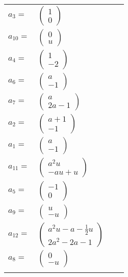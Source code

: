 \documentclass[1p]{elsarticle_modified}
\theoremstyle{definition}
\begin{document}
\begin{tabular}{m{7pt} m{180pt} m{7pt} m{180pt} }
\flushright $a_{3}=$&$\begin{pmatrix}1\\0\end{pmatrix}$ \\
\flushright $a_{10}=$&$\begin{pmatrix}0\\u\end{pmatrix}$ \\
\flushright $a_{4}=$&$\begin{pmatrix}1\\-2\end{pmatrix}$ \\
\flushright $a_{6}=$&$\begin{pmatrix}a\\-1\end{pmatrix}$ \\
\flushright $a_{7}=$&$\begin{pmatrix}a\\2 a-1\end{pmatrix}$ \\
\flushright $a_{2}=$&$\begin{pmatrix}a+1\\-1\end{pmatrix}$ \\
\flushright $a_{1}=$&$\begin{pmatrix}a\\-1\end{pmatrix}$ \\
\flushright $a_{11}=$&$\begin{pmatrix}a^2 u\\- a u+u\end{pmatrix}$ \\
\flushright $a_{5}=$&$\begin{pmatrix}-1\\0\end{pmatrix}$ \\
\flushright $a_{9}=$&$\begin{pmatrix}u\\- u\end{pmatrix}$ \\
\flushright $a_{12}=$&$\begin{pmatrix}a^2 u- a-\frac{1}{2} u\\2 a^2-2 a-1\end{pmatrix}$ \\
\flushright $a_{8}=$&$\begin{pmatrix}0\\- u\end{pmatrix}$\\&\end{tabular}
\end{document}

